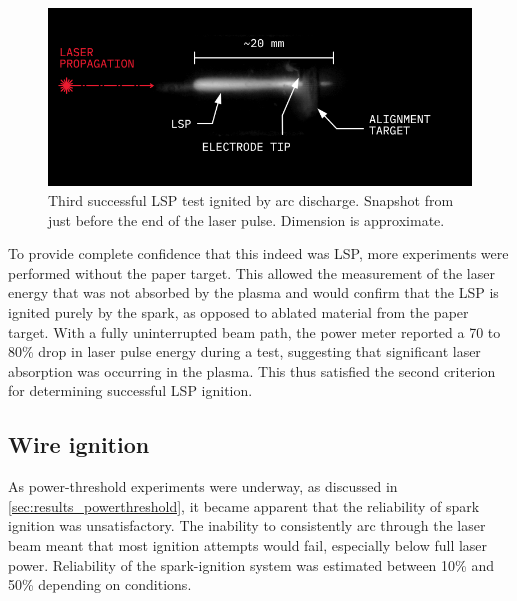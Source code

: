             \begin{figure}[h]
                \centering
                \includegraphics[]{assets/3 design/LSP3_annotated.jpg}
                \caption[Third successful LSP test ignited by arc discharge]{Third successful LSP test ignited by arc discharge. Snapshot from just before the end of the laser pulse. Dimension is approximate.}
                \label{fig:lsp3}
            \end{figure}

            To provide complete confidence that this indeed was LSP, more experiments were performed without the paper target. This allowed the measurement of the laser energy that was not absorbed by the plasma and would confirm that the LSP is ignited purely by the spark, as opposed to ablated material from the paper target. With a fully uninterrupted beam path, the power meter reported a 70 to 80\% drop in laser pulse energy during a test, suggesting that significant laser absorption was occurring in the plasma. This thus satisfied the second criterion for determining successful LSP ignition.

        \subsection{Wire ignition} \label{subsec:results_wireignition}
            As power-threshold experiments were underway, as discussed in \autoref{sec:results_powerthreshold}, it became apparent that the reliability of spark ignition was unsatisfactory. The inability to consistently arc through the laser beam meant that most ignition attempts would fail, especially below full laser power. Reliability of the spark-ignition system was estimated between 10\% and 50\% depending on conditions.

